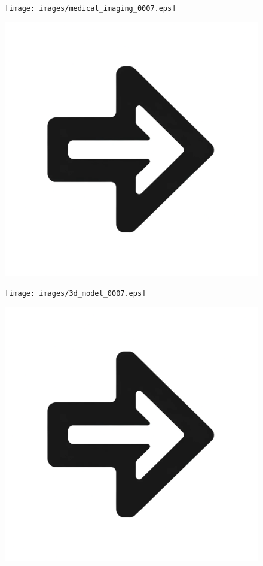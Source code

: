 \documentclass[compress]{beamer}
\begin{document}
\begin{frame}
\begin{figure}[]
\begin{minipage}[c][0.33\paperheight][c]{\linewidth}
{\begin{minipage}{0.18\linewidth}
					\texttt{[image: images/medical\_imaging\_0007.eps]}
				\end{minipage}
				\hfill
				\begin{minipage}{0.1\linewidth}
					\includegraphics[width=\linewidth]{images/right_arrow.png}
				\end{minipage}
				\hfill
				\begin{minipage}{0.18\linewidth}
					\texttt{[image: images/3d\_model\_0007.eps]}
				\end{minipage}
				\hfill
				\begin{minipage}{0.1\linewidth}
					\includegraphics[width=\linewidth]{images/right_arrow.png}

\end{minipage}}
\end{minipage}
\end{figure}
\end{frame}
\end{document}
